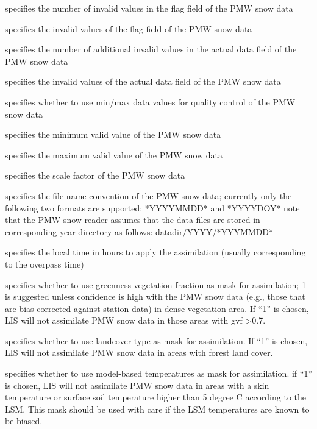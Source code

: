   specifies
 the number of invalid values in the flag field of the PMW snow data

  specifies the invalid values
 of the flag field of the PMW snow data

  specifies
 the number of additional invalid values in the actual data field of 
 the PMW snow data

  specifies the invalid
 values of the actual data field of the PMW snow data

  specifies whether to use
 min/max data values for quality control of the PMW snow data

  specifies the minimum valid 
 value of the PMW snow data

  specifies the maximum valid 
 value of the PMW snow data

  specifies the scale factor of
 the PMW snow data

  specifies the file name
 convention of the PMW snow data; currently only the following two
 formats are supported:
 *YYYYMMDD*  and *YYYYDOY*
 note that the PMW snow reader assumes that the data files are stored
 in corresponding year directory as follows: datadir/YYYY/*YYYMMDD*

  specifies the local time
 in hours to apply the assimilation (usually corresponding to the overpass time)

  specifies 
 whether to use greenness vegetation fraction as mask for assimilation;
 1 is suggested unless confidence is high with the PMW snow data (e.g.,
 those that are bias corrected against station data) in dense vegetation
 area.  If ``1'' is chosen, LIS will not assimilate PMW snow data in
 those areas with gvf \textgreater 0.7.

 specifies whether to use landcover type as mask for assimilation.
 If ``1'' is chosen, LIS will not assimilate PMW snow data in areas
 with forest land cover.
 
 specifies whether to use model-based temperatures as mask for
 assimilation. if ``1'' is chosen, LIS will not assimilate PMW snow
 data in areas with a skin temperature or surface soil temperature
 higher than 5 degree C according to the LSM. This mask should be
 used with care if the LSM temperatures are known to be biased.

